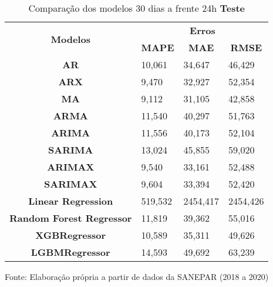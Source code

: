 \begin{table}[H]
	\centering
	\caption{Comparação dos modelos 30 dias a frente 24h \textbf{Teste} }\label{tb:60-24tst}
	\begin{tabular}{@{}clll@{}}
		\toprule
		\multirow{2}{*}{\textbf{Modelos}} & \multicolumn{3}{c}{\textbf{Erros}}                                                                       \\ \cmidrule(l){2-4} 
		& \multicolumn{1}{c}{\textbf{MAPE}} & \multicolumn{1}{c}{\textbf{MAE}} & \multicolumn{1}{c}{\textbf{RMSE}} \\ \hline
\textbf{AR}                       & 10,061                            & 34,647                           & 46,429                            \\
\textbf{ARX}                      & 9,470                             & 32,927                           & 52,354                            \\
\textbf{MA}                       & 9,112                             & 31,105                           & 42,858                            \\
\textbf{ARMA}                     & 11,540                            & 40,297                           & 51,763                            \\
\textbf{ARIMA}                    & 11,556                            & 40,173                           & 52,104                            \\
\textbf{SARIMA}                   & 13,024                            & 45,855                           & 59,020                            \\
\textbf{ARIMAX}                   & 9,540                             & 33,161                           & 52,488                            \\
\textbf{SARIMAX}                  & 9,604                             & 33,394                           & 52,420                            \\
\textbf{Linear Regression}        & 519,532                           & 2454,417                         & 2454,426                          \\
\textbf{Random Forest Regressor}  & 11,819                            & 39,362                           & 55,016                            \\
\textbf{XGBRegressor}             & 10,589                            & 35,311                           & 49,626                            \\
\textbf{LGBMRegressor}            & 14,593                            & 49,692                           & 63,239                            \\ \bottomrule
	\end{tabular}

Fonte: Elaboração própria a partir de dados da SANEPAR (2018 a 2020)
\end{table}

